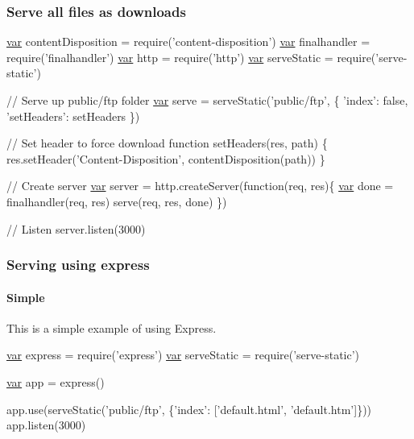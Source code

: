 \subsubsection*{Serve all files as downloads}


\begin{DoxyCode}
\hyperlink{018__def_8c_a335628f2e9085305224b4f9cc6e95ed5}{var} contentDisposition = require(\textcolor{stringliteral}{'content-disposition'})
\hyperlink{018__def_8c_a335628f2e9085305224b4f9cc6e95ed5}{var} finalhandler = require('finalhandler')
\hyperlink{018__def_8c_a335628f2e9085305224b4f9cc6e95ed5}{var} http = require('http')
\hyperlink{018__def_8c_a335628f2e9085305224b4f9cc6e95ed5}{var} serveStatic = require('serve-static')

\textcolor{comment}{// Serve up public/ftp folder}
\hyperlink{018__def_8c_a335628f2e9085305224b4f9cc6e95ed5}{var} serve = serveStatic('public/ftp', \{
  \textcolor{stringliteral}{'index'}: \textcolor{keyword}{false},
  \textcolor{stringliteral}{'setHeaders'}: setHeaders
\})

\textcolor{comment}{// Set header to force download}
\textcolor{keyword}{function} setHeaders(res, path) \{
  res.setHeader(\textcolor{stringliteral}{'Content-Disposition'}, contentDisposition(path))
\}

\textcolor{comment}{// Create server}
\hyperlink{018__def_8c_a335628f2e9085305224b4f9cc6e95ed5}{var} server = http.createServer(\textcolor{keyword}{function}(req, res)\{
  \hyperlink{018__def_8c_a335628f2e9085305224b4f9cc6e95ed5}{var} done = finalhandler(req, res)
  serve(req, res, done)
\})

\textcolor{comment}{// Listen}
server.listen(3000)
\end{DoxyCode}


\subsubsection*{Serving using express}

\paragraph*{Simple}

This is a simple example of using Express.


\begin{DoxyCode}
\hyperlink{018__def_8c_a335628f2e9085305224b4f9cc6e95ed5}{var} express = require(\textcolor{stringliteral}{'express'})
\hyperlink{018__def_8c_a335628f2e9085305224b4f9cc6e95ed5}{var} serveStatic = require('serve-static')

\hyperlink{018__def_8c_a335628f2e9085305224b4f9cc6e95ed5}{var} app = express()

app.use(serveStatic('public/ftp', \{\textcolor{stringliteral}{'index'}: [\textcolor{stringliteral}{'default.html'}, \textcolor{stringliteral}{'default.htm'}]\}))
app.listen(3000)
\end{DoxyCode}


